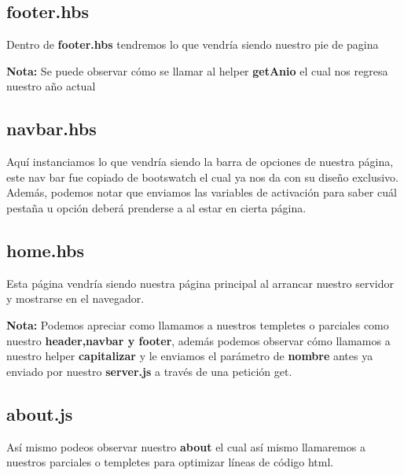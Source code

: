 \documentclass{report}
\begin{document}
  \subsection{footer.hbs}
  Dentro de \textbf{footer.hbs} tendremos lo que vendría siendo nuestro pie de pagina
  
  \textbf{Nota:}
  Se puede observar cómo se llamar al helper \textbf{getAnio} el cual nos regresa nuestro año actual
  \subsection{navbar.hbs}
  Aquí instanciamos lo que vendría siendo la barra de opciones de nuestra página, este nav bar fue copiado de bootswatch el cual ya nos da con su diseño exclusivo.
  \\
  Además, podemos notar que enviamos las variables de activación para saber cuál pestaña u opción deberá prenderse a al estar en cierta página.
  
  \subsection{home.hbs}
  Esta página vendría siendo nuestra página principal al arrancar nuestro servidor y mostrarse en el navegador.
  
  \textbf{Nota:}
  Podemos apreciar como llamamos a nuestros templetes o parciales como nuestro \textbf{header,navbar y footer}, además podemos observar cómo llamamos a nuestro helper \textbf{capitalizar} y le enviamos el parámetro de \textbf{nombre} antes ya enviado por nuestro \textbf{server.js} a través de una petición get.
  \subsection{about.js}
  Así mismo podeos observar nuestro \textbf{about} el cual así mismo llamaremos a nuestros parciales o templetes para optimizar líneas de código html.
  
\end{document}

